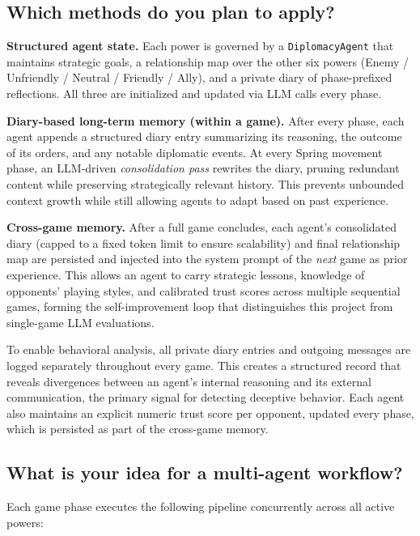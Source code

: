 \documentclass[a4paper,oneside,bibliography=totoc]{scrbook}
\begin{document}
\subsection{Which methods do you plan to apply?}

\textbf{Structured agent state.} Each power is governed by a \texttt{DiplomacyAgent} that maintains strategic goals, a relationship map over the other six powers (Enemy / Unfriendly / Neutral / Friendly / Ally), and a private diary of phase-prefixed reflections. All three are initialized and updated via LLM calls every phase.

\textbf{Diary-based long-term memory (within a game).} After every phase, each agent appends a structured diary entry summarizing its reasoning, the outcome of its orders, and any notable diplomatic events. At every Spring movement phase, an LLM-driven \emph{consolidation pass} rewrites the diary, pruning redundant content while preserving strategically relevant history. This prevents unbounded context growth while still allowing agents to adapt based on past experience.

\textbf{Cross-game memory.} After a full game concludes, each agent's consolidated diary (capped to a fixed token limit to ensure scalability) and final relationship map are persisted and injected into the system prompt of the \emph{next} game as prior experience. This allows an agent to carry strategic lessons, knowledge of opponents' playing styles, and calibrated trust scores across multiple sequential games, forming the self-improvement loop that distinguishes this project from single-game LLM evaluations.

To enable behavioral analysis, all private diary entries and outgoing messages are logged separately throughout every game. This creates a structured record that reveals divergences between an agent's internal reasoning and its external communication, the primary signal for detecting deceptive behavior. Each agent also maintains an explicit numeric trust score per opponent, updated every phase, which is persisted as part of the cross-game memory.

\subsection{What is your idea for a multi-agent workflow?}

Each game phase executes the following pipeline concurrently across all active powers:
\end{document}
